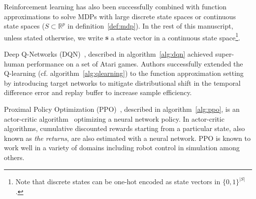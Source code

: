 Reinforcement learning has also been successfully combined with function approximations to solve MDPs with large discrete state spaces or continuous state spaces ($S\subset \mathbb{R}^p$ in definition~\ref{def:mdp}).
In the rest of this manuscript, unless stated otherwise, we write $\boldsymbol{s}$ a state vector in a continuous state space\footnote{Note that discrete states can be one-hot encoded as state vectors in $\{0, 1\}^{|S|}$.}.

Deep Q-Networks (DQN)~\cite{dqn}, described in algorithm~\ref{alg:dqn} achieved super-human performance on a set of Atari games.
Authors successfully extended the Q-learning (cf. algorithm~\ref{alg:qlearning}) to the function approximation setting by introducing target networks to mitigate distributional shift in the temporal difference error and replay buffer to increase sample efficiency.

Proximal Policy Optimization (PPO)~\cite{ppo}, described in algorithm~\ref{alg:ppo}, is an actor-critic algorithm~\cite{sutton} optimizing a neural network policy. 
In actor-critic algorithms, cumulative discounted rewards starting from a particular state, also known as \textit{the returns}, are also estimated with a neural network. 
PPO is known to work well in a variety of domains including robot control in simulation among others.

